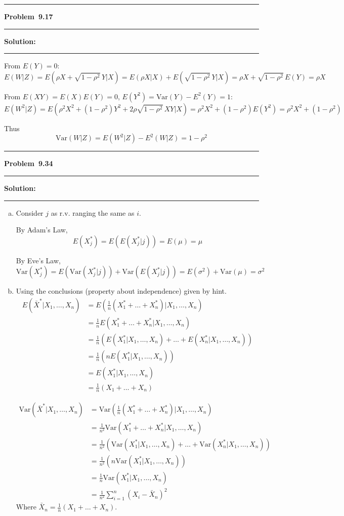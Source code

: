 \documentclass[10.5pt]{article}
\newcommand\question[1]{\vspace{.2in}\hrule\vspace{0.04in}\textbf{Problem\ #1}\vspace{.4em}\hrule\vspace{.10in}}
\newcommand\Solution{\vspace{.3in}\textbf{Solution:}\vspace{.5em}\hrule\vspace{.08in}\par}
\begin{document}
\pagebreak

\question{9.17}
\Solution{}
From $E(Y) = 0$:
$$	E(W|Z) = E(\rho X+\sqrt{1-\rho^2}\, Y| X) = E(\rho X|X)+E(\sqrt{1-\rho^2}\, Y| X) = \rho X+\sqrt{1-\rho^2}\, E(Y) = \rho X$$
\vspace{0.7cm}

From $E(XY) = E(X)E(Y) = 0$, $E(Y^2) = \text{Var}(Y) - E^2(Y) = 1$:
	$$E(W^2|Z) = E(\rho^2 X^2+(1-\rho^2)Y^2+2\rho\sqrt{1-\rho^2}\, XY| X) = \rho^2 X^2 + (1-\rho^2)E(Y^2) = \rho^2 X^2+(1-\rho^2)$$

Thus
	$$\text{Var}(W|Z) = E(W^2|Z) - E^2(W|Z) = 1-\rho^2$$


\vspace{1cm}

\question{9.34}
\Solution{}
\begin{enumerate}[(a)]
	\item Consider $j$ as r.v. ranging the same as $i$.
	
	By Adam's Law, $$E(X_j^*) = E(E(X_j^*|j)) = E(\mu) = \mu$$

	By Eve's Law, $$\text{Var}(X_j^*) = E(\text{Var}(X_j^*|j))+\text{Var}(E(X_j^*|j)) = E(\sigma^2)+\text{Var}(\mu) = \sigma^2$$

	\item Using the conclusions (property about independence) given by hint.
	\begin{align*}
		E(\bar{X}^*|X_1, \dots, X_n) 
		&= E(\frac{1}{n}(X_1^*+\dots+X_n^*)|X_1, \dots, X_n)\\[6pt]
		&= \frac{1}{n}E(X_1^*+\dots+X_n^*|X_1, \dots, X_n)\\[6pt]
		&= \frac{1}{n}(E(X_1^*|X_1, \dots, X_n)+\dots+E(X_n^*|X_1, \dots, X_n))\\[6pt]
		&= \frac{1}{n}(nE(X_1^*|X_1, \dots, X_n))\\[6pt]
		&= E(X_1^*|X_1, \dots, X_n)\\[6pt]
		&= \frac{1}{n}(X_1+\dots+X_n)
	\end{align*}

	\begin{align*}
		\text{Var}(\bar{X}^*|X_1, \dots, X_n) 
		&= \text{Var}(\frac{1}{n}(X_1^*+\dots+X_n^*)|X_1, \dots, X_n)\\[6pt]
		&= \frac{1}{n^2}\text{Var}(X_1^*+\dots+X_n^*|X_1, \dots, X_n)\\[6pt]
		&= \frac{1}{n^2}(\text{Var}(X_1^*|X_1, \dots, X_n)+\dots+\text{Var}(X_n^*|X_1, \dots, X_n))\\[6pt]
		&= \frac{1}{n^2}(n\text{Var}(X_1^*|X_1, \dots, X_n))\\[6pt]
		&= \frac{1}{n}\text{Var}(X_1^*|X_1, \dots, X_n)\\[6pt]
		&= \frac{1}{n^2}\sum_{i = 1}^n(X_i - \bar{X}_n)^2
	\end{align*} 
	Where $\bar{X}_n = \frac{1}{n}(X_1+\dots+X_n)$.


\end{enumerate}
\end{document}

